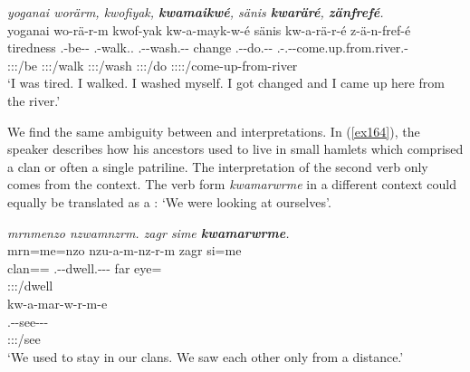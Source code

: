 \begin{exe}
	\ex \emph{yoganai worärm, kwofiyak, \textbf{kwamaikwé}, sänis \textbf{kwaräré}, \textbf{zänfrefé}.}\\
	\glll yoganai wo-rä-r-m kwof-yak kw-a-mayk-w-é sänis kw-a-rä-r-é z-ä-n-fref-é\\
	tiredness \Fsg.\Alph-be-\Lk-\Dur{} \Fsg.\Betatwo-walk.\Ext.\Ndu{} \M.\Betaone-\Vc-wash.\Ext-\Ndu-\Fsg{} change \M.\Betaone-\Vc-do.\Ext-\Lk-\Fsg{} \M.\Gam-\Vc.\Ndu-\Venit-come.up.from.river.\Rs-\Fsg\\
	{} \footnotesize{\Fsg:\Sbj:\Rpst:\Dur/be} \footnotesize{\Fsg:\Sbj:\Rpst:\Ipfv/walk} \footnotesize{\Fsg:\Sbj:\Rpst:\Ipfv/wash} {} \footnotesize{\Fsg:\Sbj:\Rpst:\Ipfv/do} \footnotesize{\Fsg:\Sbj:\Rpst:\Pfv:\Venit/come-up-from-river}\\
	\trans `I was tired. I walked. I washed myself. I got changed and I came up here from the river.'
	\label{ex163}
\end{exe}

We find the same ambiguity between  and  interpretations. In (\ref{ex164}), the speaker describes how his ancestors used to live in small hamlets which comprised a clan or often a single patriline. The  interpretation of the second verb only comes from the context. The verb form \emph{kwamarwrme} in a different context could equally be translated as a : `We were looking at ourselves'.

\begin{exe}
	\ex \emph{mrnmenzo nzwamnzrm. zagr sime \textbf{kwamarwrme}.}\\
	\glll mrn=me=nzo nzu-a-m-nz-r-m zagr si=me\\
	clan=\Ins=\Only{} \Fnsg.\Betaone-\Vc-dwell.\Ext-\Ndu-\Lk-\Dur{} far eye=\Ins{}\\
	{} \footnotesize{\Fpl:\Sbj:\Pst:\Dur/dwell} {} {}\\
	\sn
	\glll kw-a-mar-w-r-m-e\\
	\M.\Betaone-\Vc-see-\Lk-\Dur-\Fnsg\\
	\footnotesize{\Fpl:\Sbj:\Pst:\Dur/see}\\
	\trans `We used to stay in our clans. We saw each other only from a distance.'\\
	\label{ex164}
\end{exe}

